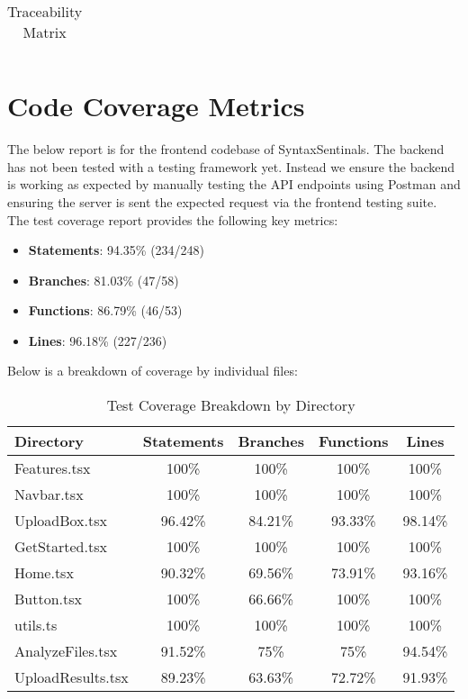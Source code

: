 \documentclass[12pt, titlepage]{article}
\begin{document}
\begin{center}
\begin{longtable}{|>{\centering\arraybackslash}p{4cm}|>{\centering\arraybackslash}p{10cm}|}
    \caption{Traceability Matrix}
    \end{longtable}
    \end{center}

\section{Code Coverage Metrics}

The below report is for the frontend codebase of SyntaxSentinals. The backend has not been tested with a testing framework yet.
Instead we ensure the backend is working as expected by manually testing the API endpoints using Postman and ensuring the server is sent the 
expected request via the frontend testing suite. \\

The test coverage report provides the following key metrics:

\begin{itemize}
\item \textbf{Statements}: 94.35\% (234/248)
\item \textbf{Branches}: 81.03\% (47/58)
\item \textbf{Functions}: 86.79\% (46/53)
\item \textbf{Lines}: 96.18\% (227/236)
\end{itemize}

\newpage

Below is a breakdown of coverage by individual files:

\begin{table}[h]
    \centering
    \begin{tabular}{|l|c|c|c|c|}
    \hline
    \textbf{Directory} & \textbf{Statements} & \textbf{Branches} & \textbf{Functions} & \textbf{Lines} \\
    \hline
    Features.tsx & 100\% & 100\% & 100\% & 100\% \\
    Navbar.tsx & 100\% & 100\% & 100\% & 100\% \\
    UploadBox.tsx & 96.42\% & 84.21\% & 93.33\% & 98.14\% \\
    GetStarted.tsx & 100\% & 100\% & 100\% & 100\% \\
    Home.tsx & 90.32\% & 69.56\% & 73.91\% & 93.16\% \\
    Button.tsx & 100\% & 66.66\% & 100\% & 100\% \\
    utils.ts & 100\% & 100\% & 100\% & 100\% \\
    AnalyzeFiles.tsx & 91.52\% & 75\% & 75\% & 94.54\% \\
    UploadResults.tsx & 89.23\% & 63.63\% & 72.72\% & 91.93\% \\
    \hline
    \end{tabular}
    \caption{Test Coverage Breakdown by Directory}
    \label{tab:coverage}
\end{table}
\end{document}
